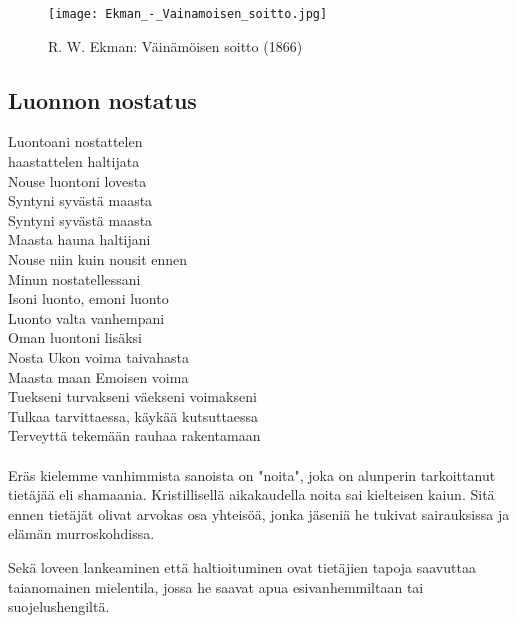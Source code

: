 
\vfill%
\begin{figure}[!ht]%
  \centering%
  \texttt{[image: Ekman\_-\_Vainamoisen\_soitto.jpg]}%
  \caption{R. W. Ekman: Väinämöisen soitto (1866)}%
\end{figure}
\vfill%


\clearpage
\subsection{Luonnon nostatus}
  \begin{large}\begin{center}\begin{em}
    Luontoani nostattelen\\
    haastattelen haltijata\\
    Nouse luontoni lovesta\\
    Syntyni syvästä maasta\\
    Syntyni syvästä maasta\\
    \vspace{1em}
    Maasta hauna haltijani\\
    Nouse niin kuin nousit ennen\\
    Minun nostatellessani\\
    \vspace{1em}
    Isoni luonto, emoni luonto\\
    Luonto valta vanhempani\\
    Oman luontoni lisäksi\\
    Nosta Ukon voima taivahasta\\
    Maasta maan Emoisen voima\\
    \vspace{1em}
    Tuekseni turvakseni väekseni voimakseni\\
    Tulkaa tarvittaessa, käykää kutsuttaessa\\
    Terveyttä tekemään rauhaa rakentamaan\\
    \vspace{1em}
  \end{em}\end{center}\end{large}

  \paragraph{}
    Eräs kielemme vanhimmista sanoista on "noita", joka on alunperin tarkoittanut tietäjää eli
    shamaania. Kristillisellä aikakaudella noita sai kielteisen kaiun. Sitä ennen tietäjät
    olivat arvokas osa yhteisöä, jonka jäseniä he tukivat sairauksissa ja elämän murroskohdissa.
    \par
    Sekä loveen lankeaminen että haltioituminen ovat tietäjien tapoja saavuttaa taianomainen
    mielentila, jossa he saavat apua esivanhemmiltaan tai suojelushengiltä.

